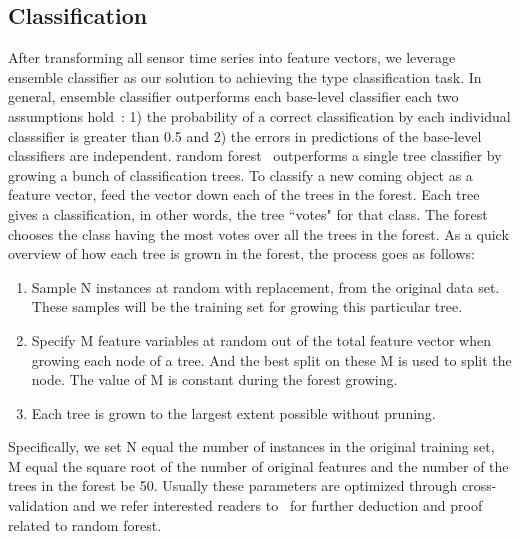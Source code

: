 \subsection{Classification}
After transforming all sensor time series into feature vectors, we leverage ensemble classifier as our solution to achieving the type classification task. In general, ensemble classifier outperforms each base-level classifier each two assumptions hold~\cite{ensem}: 1) the probability of a correct classification by each individual classsifier is greater than 0.5 and 2) the errors in predictions of the base-level classifiers are independent. random forest~\cite{RF} outperforms a single tree classifier by growing a bunch of classification trees. To classify a new coming object as a feature vector, feed the vector down each of the trees in the forest. Each tree gives a classification, in other words, the tree ``votes" for that class. The forest chooses the class having the most votes over all the trees in the forest. As a quick overview of how each tree is grown in the forest, the process goes as follows:
\begin{enumerate}
\item Sample N instances at random with replacement, from the original data set. These samples will be the training set for growing this particular tree.
\item Specify M feature variables at random out of the total feature vector when growing each node of a tree. And the best split on these M is used to split the node. The value of M is constant during the forest growing.
\item Each tree is grown to the largest extent possible without pruning.
\end{enumerate}
Specifically, we set N equal the number of instances in the original training set, M equal the square root of the number of original features and the number of the trees in the forest be 50. Usually these parameters are optimized through cross-validation and we refer interested readers to~\cite{RF} for further deduction and proof related to random forest.


